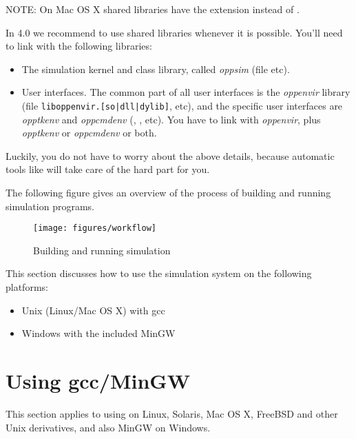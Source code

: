 NOTE: On Mac OS X shared libraries have the  extension instead of .

In {\opp} 4.0 we recommend to use shared libraries whenever it is possible.
You'll need to link with the following libraries:

\begin{itemize}
  \item{The simulation kernel and class library,
    called \textit{oppsim} (file  etc).}
  \item{User interfaces. The common part of all user interfaces is
    the \textit{oppenvir} library (file \texttt{liboppenvir.[so|dll|dylib]}, etc),
    and the specific user interfaces are \textit{opptkenv} and \textit{oppcmdenv}
    (, , etc). 
    You have to link with \textit{oppenvir}, plus \textit{opptkenv} or 
    \textit{oppcmdenv} or both.}
\end{itemize}

Luckily, you do not have to worry about the above details, because
automatic tools like  will take care of the hard
part for you.

The following figure gives an overview of the process of building
and running simulation programs.

\begin{figure}[htbp]
  \begin{center}
    \texttt{[image: figures/workflow]}
    \caption{Building and running simulation}
  \end{center}
\end{figure}


This section discusses how to use the simulation system on the
following platforms:
\begin{itemize}
  \item{Unix (Linux/Mac OS X) with gcc}
  \item{Windows with the included MinGW}
\end{itemize}


\section{Using gcc/MinGW}

This section applies to using {\opp} on Linux, Solaris, Mac OS X, FreeBSD and
other Unix derivatives, and also MinGW on Windows.

